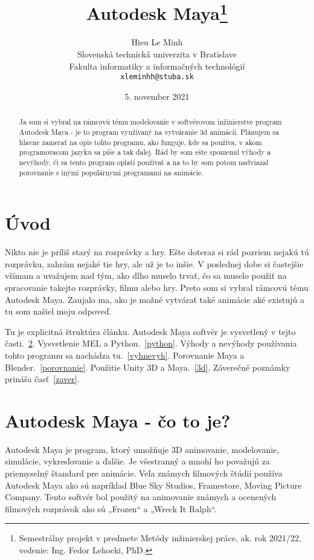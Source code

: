\documentclass[10pt,oneside,slovak,a4paper]{article}
\title{Autodesk Maya\thanks{Semestrálny projekt v predmete Metódy inžinierskej práce, ak. rok 2021/22, vedenie: Ing. Fedor Lehocki, PhD.}}
\author{Hieu Le Minh\\[2pt]
	{\small Slovenská technická univerzita v Bratislave}\\
	{\small Fakulta informatiky a informačných technológií}\\
	{\small \texttt{xleminhh@stuba.sk}}
	}
\date{\small 5. november 2021}
\begin{document}
\maketitle

\begin{abstract}
Ja som si vybral na rámcovú tému modelovanie v softvérovom inžinierstve program Autodesk Maya
- je to program využívaný na vytváranie 3d animácií. 
Plánujem sa hlavne zamerať na opis tohto programu, ako funguje, kde sa používa, v akom 
programovacom jazyku sa píše a tak ďalej. Rád by som ešte spomenul výhody a nevýhody, či 
sa tento program oplatí používať a na to by som potom nadviazal porovnanie s inými populárnymi programami
na animácie.
\end{abstract}



\section{Úvod}

Nikto nie je príliš starý na rozprávky a hry. Ešte doteraz si rád pozriem nejakú tú rozprávku, zahrám nejaké tie hry, ale už je to inšie. V poslednej dobe si častejšie všímam a uvažujem nad tým, ako dlho muselo trvať, čo sa muselo použiť na spracovanie takejto rozprávky, filmu alebo hry. Preto som si vybral rámcovú tému Autodesk Maya. Zaujalo ma, ako je možné vytvárať také animácie aké existujú a tu som našiel moju odpoveď.

Tu je explicitná štruktúra článku.
Autodesk Maya softvér je vysvetlený v tejto časti.~\ref{AM}.
Vysvetlenie MEL a Python.~\ref{python}.
Výhody a nevýhody používania tohto programu sa nachádza tu.~\ref{vyhnevyh}.
Porovnanie Maya a Blender.~\ref{porovnanie}.
Použitie Unity 3D a Maya.~\ref{3d}.
Záverečné poznámky prináša časť~\ref{zaver}.



\section{Autodesk Maya - čo to je?} \label{AM}

Autodesk Maya je program, ktorý umožňuje 3D animovanie, modelovanie, simulácie, vykresľovanie a ďalšie. Je všestranný a mnohí ho považujú za priemyselný štandard pre animácie. Veľa známych filmových štúdií používa Autodesk Maya ako sú napríklad Blue Sky Studios, Framestore, Moving Picture Company. Tento softvér bol použitý na animovanie známych a ocenených filmových rozprávok ako sú „Frozen“ a „Wreck It Ralph“.\\
\end{document}
